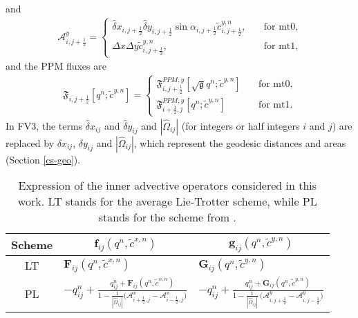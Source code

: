 and
\begin{align}
	\mathcal{A}_{i,j+\frac{1}{2}}^y= 
	\begin{cases}
		\hat{\delta} x_{i,j+\frac{1}{2}}  \hat{\delta} y_{i,j+\frac{1}{2}} 
		\sin{\alpha_{i,j+\frac{1}{2}}}
		{\tilde{c}}_{i,j+\frac{1}{2}}^{y,n},
		\quad &\text{for mt0},\\
		{\Delta x}{\Delta y}{\tilde{c}}_{i,j+\frac{1}{2}}^{y,n},
		\quad &\text{for mt1},
	\end{cases}
\end{align}
and the PPM fluxes are
\begin{align}
	\mathfrak{F}_{i,j+\frac{1}{2}} [{{q}^n;\tilde{c}^{y,n}}]= 
	\begin{cases}
		\mathfrak{F}_{i,j+\frac{1}{2}}^{PPM,y}[{{\sqrt{\mathfrak{g}}q}^n;\tilde{c}^{y,n}}]
		\quad &\text{for mt0},\\
		\mathfrak{F}_{i+\frac{1}{2},j}^{PPM,y}[{{q}^n;\tilde{c}^{y,n}}]
		\quad &\text{for mt1}.
	\end{cases}
\end{align}
In FV3, the terms ${\hat{\delta} x_{ij}}$ and ${\hat{\delta} y_{ij}}$ and $|\hat{\Omega}_{ij}|$ (for integers or half integers $i$ and $j$)
are replaced by ${{\delta} x_{ij}}$, ${{\delta} y_{ij}}$ and $|\hat{\Omega}_{ij}|$,
which represent the geodesic distances and areas (Section \ref{cs-geo}).
\begin{table}[!h]
	\begin{tabular}{|c|l|l|}
		\hline
		Scheme & \multicolumn{1}{c|}{$\mathbf{f}_{ij}(q^n, \tilde{c}^{x,n})$}
		& \multicolumn{1}{c|}{$\mathbf{g}_{ij}(q^n, \tilde{c}^{y,n})$} \\ \hline
		LT   & $\mathbf{F}_{ij}(q^n,\tilde{c}^{x,n})$ 
		& $\mathbf{G}_{ij}(q^n,\tilde{c}^{y,n})$ \\ \hline
		PL   & $-q_{ij}^n +
		\frac{q_{ij}^n  + \mathbf{F}_{ij}(q^n,\tilde{c}^{x,n})}
		{1 - \frac{1}{|\hat{\Omega}_{ij}|}\big(\mathcal{A}_{i+\frac{1}{2},j}^{x} - \mathcal{A}_{i-\frac{1}{2},j}^{x}\big)}$
		& $-q_{ij}^n +
		\frac{q_{ij}^n  + \mathbf{G}_{ij}(q^n,\tilde{c}^{y,n})}
		{1 - \frac{1}{|\hat{\Omega}_{ij}|}\ \big(\mathcal{A}_{i,j+\frac{1}{2}}^{y} - \mathcal{A}_{i,j-\frac{1}{2}}^{y}\big)}$
		\\ \hline
	\end{tabular}
	\caption{Expression of the inner advective operators considered in this work.
		LT stands for the average Lie-Trotter  scheme, while PL stands for the scheme from \citet{putman:2007}.}
	\label{chp-csfv-tab1}
\end{table}


